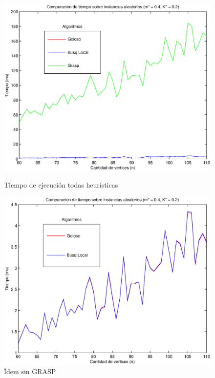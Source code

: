 \begin{figure}[H]
    \begin{minipage}{0.5\linewidth}
      \includegraphics[width=\linewidth]{graficos/todos_tiempo_randm4K2.eps}
      \caption{Tiempo de ejecución todas heurísticas}\label{fig:tiempo-all}
    \end{minipage}
    \hfill
    \begin{minipage}{0.5\linewidth}
      \includegraphics[width=\linewidth]{graficos/todos_tiempo_randm4K2SinG.eps}
      \caption{Ídem sin GRASP}\label{fig:tiempo-sin-grasp}
    \end{minipage}    
\end{figure}

